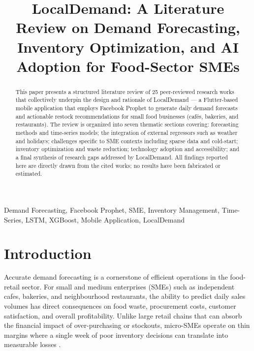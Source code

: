 \documentclass[conference]{IEEEtran}
\begin{document}
\title{LocalDemand: A Literature Review on Demand Forecasting,
Inventory Optimization, and AI Adoption for Food-Sector SMEs}

\author{%
}

\maketitle

\begin{abstract}
This paper presents a structured literature review of 25 peer-reviewed
research works that collectively underpin the design and rationale of
LocalDemand --- a Flutter-based mobile application that employs
Facebook Prophet to generate daily demand forecasts and actionable
restock recommendations for small food businesses (cafés, bakeries, and
restaurants). The review is organized into seven thematic sections
covering: forecasting methods and time-series models; the integration of
external regressors such as weather and holidays; challenges specific to
SME contexts including sparse data and cold-start; inventory optimization
and waste reduction; technology adoption and accessibility; and a final
synthesis of research gaps addressed by LocalDemand. All findings
reported here are directly drawn from the cited works; no results have
been fabricated or estimated.
\end{abstract}

\begin{IEEEkeywords}
Demand Forecasting, Facebook Prophet, SME, Inventory Management,
Time-Series, LSTM, XGBoost, Mobile Application, LocalDemand
\end{IEEEkeywords}

\section{Introduction}

Accurate demand forecasting is a cornerstone of efficient operations in
the food-retail sector. For small and medium enterprises (SMEs) such as
independent cafes, bakeries, and neighbourhood restaurants, the ability
to predict daily sales volumes has direct consequences on food waste,
procurement costs, customer satisfaction, and overall profitability.
Unlike large retail chains that can absorb the financial impact of
over-purchasing or stockouts, micro-SMEs operate on thin margins where a
single week of poor inventory decisions can translate into measurable
losses \cite{rahmatillah2026, groene_zakharov}.
\end{document}
